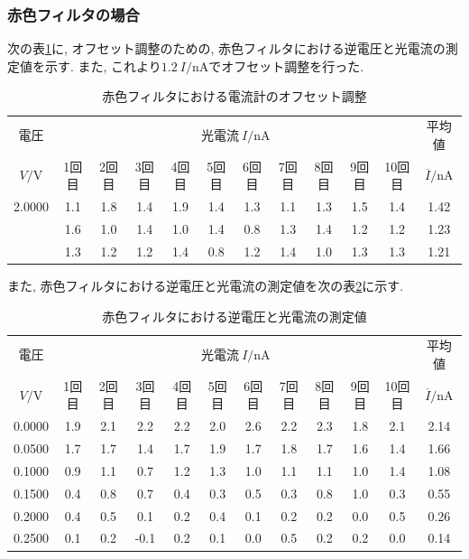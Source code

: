\documentclass{jarticle}
\begin{document}
\subsubsection{赤色フィルタの場合}

次の表\ref{tb:red-filter-offset}に, オフセット調整のための, 赤色フィルタにおける逆電圧と光電流の測定値を示す.
また, これより$1.2\ I/\mathrm{nA}$でオフセット調整を行った.

\begin{table}[H]
  \caption{赤色フィルタにおける電流計のオフセット調整}
  \label{tb:red-filter-offset}
  \hspace{-2.5cm}
  \begin{tabular}{cccccccccccc}
    \hline
    電圧 & \multicolumn{10}{c}{光電流$\ I/\mathrm{nA}$} & 平均値 \\
    $V/\mathrm{V}$ & 1回目 & 2回目 & 3回目 & 4回目 & 5回目 & 6回目 & 7回目 & 8回目 & 9回目 & 10回目 & $\overline{I}/\mathrm{nA}$ \\
    \hline
    2.0000 & 1.1 & 1.8 & 1.4 & 1.9 & 1.4 & 1.3 & 1.1 & 1.3 & 1.5 & 1.4 & 1.42 \\
    & 1.6 & 1.0 & 1.4 & 1.0 & 1.4 & 0.8 & 1.3 & 1.4 & 1.2 & 1.2 & 1.23 \\
    & 1.3 & 1.2 & 1.2 & 1.4 & 0.8 & 1.2 & 1.4 & 1.0 & 1.3 & 1.3 & 1.21 \\
    \hline
  \end{tabular}
\end{table}

また, 赤色フィルタにおける逆電圧と光電流の測定値を次の表\ref{tb:red-filter}に示す.

\begin{table}[H]
  \caption{赤色フィルタにおける逆電圧と光電流の測定値}
  \label{tb:red-filter}
  \hspace{-2.5cm}
  \begin{tabular}{cccccccccccc}
    \hline
    電圧 & \multicolumn{10}{c}{光電流$\ I/\mathrm{nA}$} & 平均値 \\
    $V/\mathrm{V}$ & 1回目 & 2回目 & 3回目 & 4回目 & 5回目 & 6回目 & 7回目 & 8回目 & 9回目 & 10回目 & $\overline{I}/\mathrm{nA}$ \\
    \hline
    0.0000 & 1.9 & 2.1 & 2.2 & 2.2 & 2.0 & 2.6 & 2.2 & 2.3 & 1.8 & 2.1 & 2.14 \\
    0.0500 & 1.7 & 1.7 & 1.4 & 1.7 & 1.9 & 1.7 & 1.8 & 1.7 & 1.6 & 1.4 & 1.66 \\
    0.1000 & 0.9 & 1.1 & 0.7 & 1.2 & 1.3 & 1.0 & 1.1 & 1.1 & 1.0 & 1.4 & 1.08 \\
    0.1500 & 0.4 & 0.8 & 0.7 & 0.4 & 0.3 & 0.5 & 0.3 & 0.8 & 1.0 & 0.3 & 0.55 \\
    0.2000 & 0.4 & 0.5 & 0.1 & 0.2 & 0.4 & 0.1 & 0.2 & 0.2 & 0.0 & 0.5 & 0.26 \\
    0.2500 & 0.1 & 0.2 & -0.1 & 0.2 & 0.1 & 0.0 & 0.5 & 0.2 & 0.2 & 0.0 & 0.14 \\
    \hline
  \end{tabular}
\end{table}
\end{document}
